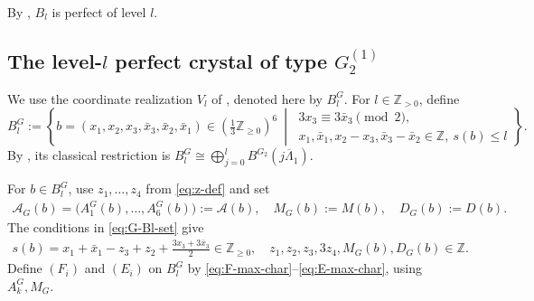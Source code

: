 \documentclass[11pt,reqno]{amsart}
\newcommand{\Z}{\mathbb Z}
\newcommand{\Zge}{\mathbb Z_{\ge 0}}
\numberwithin{table}{section}
\numberwithin{equation}{section}
\theoremstyle{plain}
\theoremstyle{definition}
\begin{document}
By \cite[Theorem~1.2]{KMOY}, \(B_l\) is perfect of level \(l\).

\subsection{\texorpdfstring{The level-$l$ perfect crystal of type
		$G_2^{(1)}$}
	{The level-l perfect crystal of type G2(1)}}

We use the coordinate realization \(V_l\) of
\cite[Section~3]{MMO}, denoted here by \(B_l^G\).
For \(l\in\Z_{>0}\), define
\begin{equation}\label{eq:G-Bl-set}
	B_l^G
	:=
	\left\{
	b=(x_1,x_2,x_3,\bar x_3,\bar x_2,\bar x_1)
	\in\left(\tfrac13\Zge\right)^6
	\ \middle|\
	\begin{gathered}
		3x_3\equiv3\bar x_3\! \! \!\!\pmod 2,\\
		x_1,\bar x_1,x_2-x_3,\bar x_3-\bar x_2\in\mathbb Z,
		\  s(b)\le l
	\end{gathered}
	\right\}.
\end{equation}
By \cite[Proposition~2]{MMO}, its classical restriction is $B_l^G
\cong
\bigoplus_{j=0}^l
B^{G_2}(j\overline{\Lambda}_1)$.


For \(b\in B_l^G\), use \(z_1,\ldots,z_4\) from
\eqref{eq:z-def} and set
\[
\begin{aligned}
	\mathcal A_G(b)
	=
	\bigl(A_1^G(b),\ldots,A_6^G(b)\bigr)
	:=
	\mathcal A(b),\quad
	M_G(b):=M(b),
	\quad
	D_G(b):=D(b).
\end{aligned}
\]
The conditions in \eqref{eq:G-Bl-set} give
\[
\begin{aligned}
	s(b)
	=
	x_1+\bar x_1-z_3+z_2
	+\frac{3x_3+3\bar x_3}{2}
	\in\Zge,\quad
	z_1,z_2,z_3,3z_4,M_G(b),D_G(b)
	\in\mathbb Z.
\end{aligned}
\]
Define \((F_i)\) and \((E_i)\) on \(B_l^G\) by
\eqref{eq:F-max-char}--\eqref{eq:E-max-char}, using
\(A_k^G,M_G\).
\end{document}
